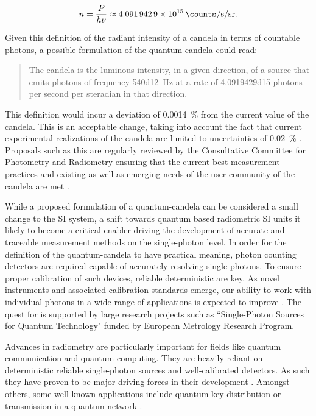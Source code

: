 		\begin{equation}
			n = \frac{P}{h \nu} \approx \SI{4.0919429d15}{\counts\per\second\per\steradian}.
		\end{equation}

	Given this definition of the radiant intensity of a candela in terms of countable photons, a possible formulation of the quantum candela could read:

	\begin{quote}
		The candela is the luminous intensity, in a given direction, of a source that emits photons of frequency \SI{540d12}{\hertz} at a rate of \num{4.0919429d15} photons per second per steradian in that direction.
	\end{quote}

	This definition would incur a deviation of \SI{0.0014}{\percent} from the current value of the candela. This is an acceptable change, taking into account the fact that current experimental realizations of the candela are limited to uncertainties of \SI{0.02}{\percent} \cite{Cheung2007}. Proposals such as this are regularly reviewed by the Consultative Committee for Photometry and Radiometry ensuring that the current best measurement practices and existing as well as emerging needs of the user community of the candela are met \cite{zwinkels2010photometry}.

	While a proposed formulation of a quantum-candela can be considered a small change to the SI system, a shift towards quantum based radiometric SI units it likely to become a critical enabler driving the development of accurate and traceable measurement methods on the single-photon level. In order for the definition of the quantum-candela to have practical meaning, photon counting detectors are required capable of accurately resolving single-photons. To ensure proper calibration of such devices, reliable deterministic \spss are key. As novel instruments and associated calibration standards emerge, our ability to work with individual photons in a wide range of applications is expected to improve \cite{buller2009single, eisaman2011invited, sangouard2012single, chunnilall2014metrology}. The quest for \spss is supported by large research projects such as ``Single-Photon Sources for Quantum Technology" funded by European Metrology Research Program.

	Advances in radiometry are particularly important for fields like quantum communication and quantum computing. They are heavily reliant on deterministic reliable single-photon sources and well-calibrated detectors. As such they have proven to be major driving forces in their development \cite{scheel2009single, chunnilall2014metrology}. Amongst others, some well known applications include quantum key distribution \cite{bennett2014quantum, beveratos2002single, alleaume2004experimental} or transmission in a quantum network \cite{childress2006fault, bernien2012two, pfaff2014unconditional}.

